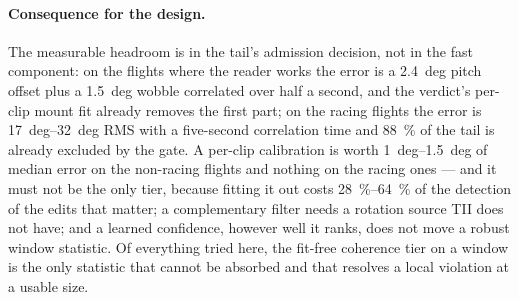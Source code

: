 \paragraph{Consequence for the design.} The measurable headroom is in the tail's admission
decision, not in the fast component: on the flights where the reader works the error is a
\SI{2.4}{deg} pitch offset plus a \SI{1.5}{deg} wobble correlated over half a second, and the
verdict's per-clip mount fit already removes the first part; on the racing flights the error is
\SIrange{17}{32}{deg} RMS with a five-second correlation time and \SI{88}{\percent} of the tail is
already excluded by the gate. A per-clip calibration is worth \SIrange{1}{1.5}{deg} of median error
on the non-racing flights and nothing on the racing ones --- and it must not be the only tier,
because fitting it out costs \SIrange{28}{64}{\percent} of the detection of the edits that matter;
a complementary filter needs a rotation source TII does not have; and a learned confidence, however
well it ranks, does not move a robust window statistic. Of everything tried here, the fit-free
coherence tier on a window is the only statistic that cannot be absorbed and that resolves a local
violation at a usable size.
